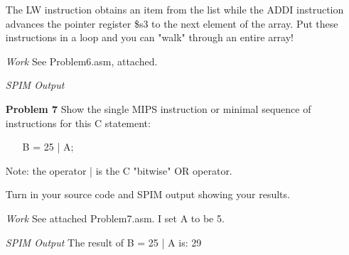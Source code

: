 \documentclass[12pt]{article}
\begin{document}
\begin{enumerate}
  \item[] The LW instruction obtains an item from the list while the ADDI instruction advances the pointer register \$s3 to the next element of the array. Put these instructions in a loop and you can "walk" through an entire array!
\end{enumerate}

\begin{enumerate}
  \item[\textit{Work}] See Problem6.asm, attached.
  \item[\textit{SPIM Output}]
\end{enumerate}






\begin{enumerate}
  \item[\textbf{Problem 7}] Show the single MIPS instruction or minimal sequence of instructions for this C statement:
  \begin{enumerate}\ttfamily
    \item[] B = 25 | A;
  \end{enumerate}

  \item[] Note: the operator | is the C "bitwise" OR operator.

  \item[] Turn in your source code and SPIM output showing your results.
\end{enumerate}

\begin{enumerate}
  \item[\textit{Work}] See attached Problem7.asm. I set A to be 5.
  \item[\textit{SPIM Output}] The result of B = 25 | A is: 29
\end{enumerate}
\end{document}
